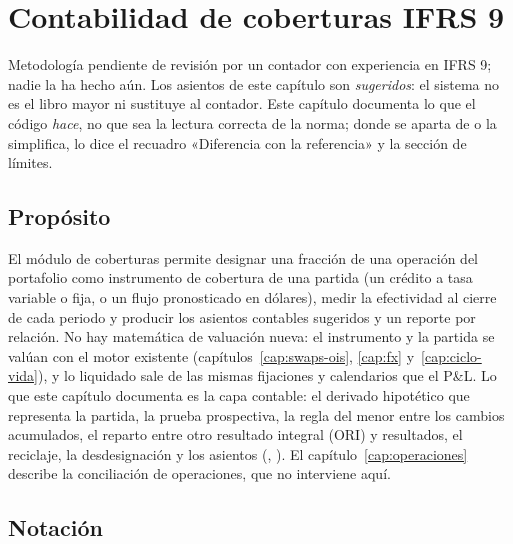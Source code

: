 \chapter{Contabilidad de coberturas IFRS 9}\label{cap:coberturas}

\begin{aviso}
  Metodología pendiente de revisión por un contador con experiencia en IFRS 9; nadie la ha hecho aún. Los asientos
  de este capítulo son \emph{sugeridos}: el sistema no es el libro mayor ni sustituye al contador. Este capítulo
  documenta lo que el código \emph{hace}, no que sea la lectura correcta de la norma; donde se aparta de
  \citet{iasb2014} o la simplifica, lo dice el recuadro «Diferencia con la referencia» y la sección de límites.
\end{aviso}

\section{Propósito}\label{sec:cap10-proposito}

El módulo de coberturas permite designar una fracción de una operación del portafolio como instrumento de cobertura de
una partida (un crédito a tasa variable o fija, o un flujo pronosticado en dólares), medir la efectividad al cierre de
cada periodo y producir los asientos contables sugeridos y un reporte por relación. No hay matemática de valuación
nueva: el instrumento y la partida se valúan con el motor existente (capítulos~\ref{cap:swaps-ois},
\ref{cap:fx} y~\ref{cap:ciclo-vida}), y lo liquidado sale de las mismas fijaciones y calendarios que el P\&L. Lo que
este capítulo documenta es la capa contable: el derivado hipotético que representa la partida, la prueba
prospectiva, la regla del menor entre los cambios acumulados, el reparto entre otro resultado integral (ORI) y
resultados, el reciclaje, la desdesignación y los asientos (,
). El capítulo~\ref{cap:operaciones} describe la conciliación de operaciones, que no
interviene aquí.

\section{Notación}\label{sec:cap10-notacion}


